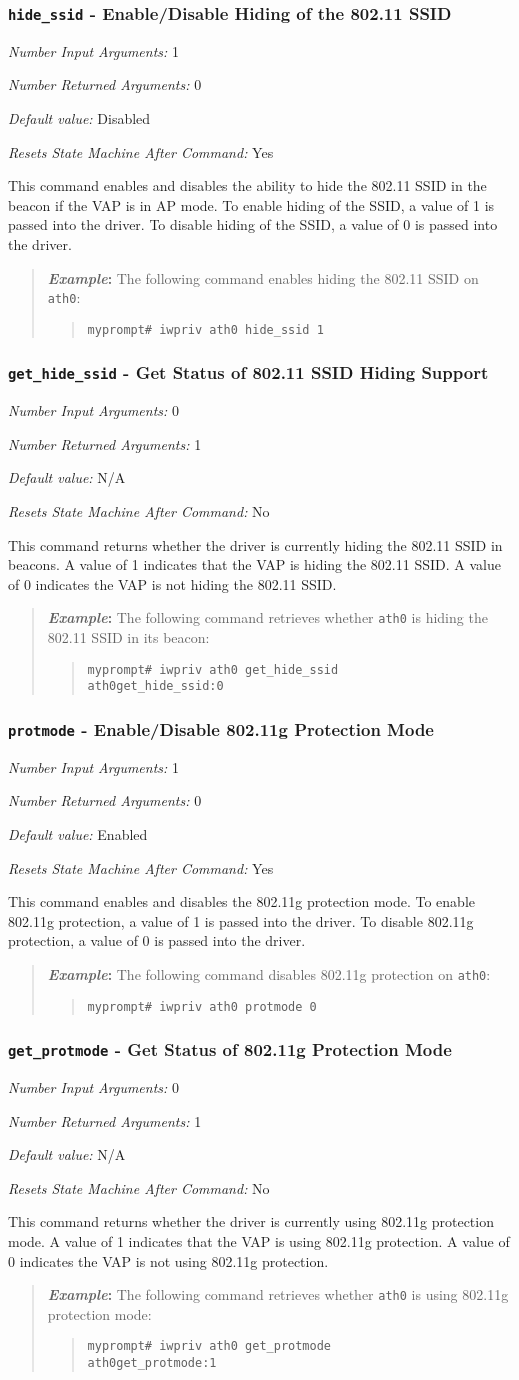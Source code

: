 \documentclass[10pt,fullpage]{article}
\newcommand{\mytt}[1]{{\texttt{#1}}}
\newcommand{\bv}{\begin{verse}}
\newcommand{\ev}{\end{verse}}
\newcommand{\cmd}[1]{{\texttt{myprompt\# #1}}}
\newcommand{\argdesc}[4]{\begin{description}
\itemsep -6pt
\item \textit{Number Input Arguments:} #1
\item \textit{Number Returned Arguments:} #2
\item \textit{Default value:} #3
\item \textit{Resets State Machine After Command:} #4
\end{description}
}
\newenvironment{example}{\begin{quote}\textbf{\textit{Example}:}}{\end{quote}}
\begin{document}
\subsubsection{\mytt{hide\_ssid} - Enable/Disable Hiding of the 802.11 SSID}
\argdesc{1}{0}{Disabled}{Yes}
This command enables and disables the ability to hide the 802.11 SSID
in the beacon if the VAP is in AP mode.  To enable hiding of the SSID,
a value of 1 is passed into the driver. To disable hiding of the SSID,
a value of 0 is passed into the driver.
\begin{example}
  The following command enables hiding the 802.11 SSID on \mytt{ath0}:
  \bv
  \cmd{iwpriv ath0 hide\_ssid 1}
  \ev
\end{example}

\subsubsection{\mytt{get\_hide\_ssid} - Get Status of 802.11 SSID
  Hiding Support}
\argdesc{0}{1}{N/A}{No}
This command returns whether the driver is currently hiding the 802.11
SSID in beacons.  A value of 1 indicates that the VAP is hiding the
802.11 SSID.  A value of 0 indicates the VAP is not hiding the 802.11
SSID.
\begin{example}
  The following command retrieves whether \mytt{ath0} is hiding the
  802.11 SSID in its beacon:
  \bv
  \cmd{iwpriv ath0 get\_hide\_ssid}\\
  \mytt{ath0\hspace{32pt}get\_hide\_ssid:0}
  \ev
\end{example}

\subsubsection{\mytt{protmode} - Enable/Disable 802.11g Protection Mode}
\argdesc{1}{0}{Enabled}{Yes}
This command enables and disables the 802.11g protection mode.  To
enable 802.11g protection, a value of 1 is passed into the driver. To
disable 802.11g protection, a value of 0 is passed into the driver.
\begin{example}
  The following command disables 802.11g protection on \mytt{ath0}:
  \bv
  \cmd{iwpriv ath0 protmode 0}
  \ev
\end{example}

\subsubsection{\mytt{get\_protmode} - Get Status of 802.11g Protection
  Mode}
\argdesc{0}{1}{N/A}{No}
This command returns whether the driver is currently using 802.11g
protection mode. A value of 1 indicates that the VAP is using 802.11g
protection.  A value of 0 indicates the VAP is not using 802.11g
protection.
\begin{example}
  The following command retrieves whether \mytt{ath0} is using 802.11g
  protection mode:
  \bv
  \cmd{iwpriv ath0 get\_protmode}\\
  \mytt{ath0\hspace{32pt}get\_protmode:1}
  \ev
\end{example}
\end{document}
